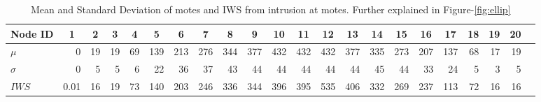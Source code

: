 \documentclass[conference,final]{IEEEtran}
\newcommand{\red}[1]{\pdfmarkupcomment[markup=Highlight,color=red]{#1}}
\newcommand{\green}[1]{\pdfmarkupcomment[markup=Highlight,color=green]{#1}}
\newcommand{\grey}[1]{\pdfmarkupcomment[markup=Highlight,color=gray]{#1}}
\newcommand*{\bd}[1]{\multicolumn{1}{|c}{\bfseries #1}}
\begin{document}

\begin{table}[t!]
\centering
\begin{tabular}{|l|*{20}{r|}r}
\hline
\bd{Node ID}           & \bd{1} & \bd{2} & \bd{3} & \bd{4} & \bd{5} & \bd{6} & \bd{7} & \bd{8} & \bd{9} & \bd{10} & \bd{11} & \bd{12} & \bd{13} & \bd{14} & \bd{15} & \bd{16} & \bd{17} & \bd{18} & \bd{19} & \bd{20} \\
\hline

$\mu$            & 0 &19 & 19& 69&139 &213&276&344&377&432 &432 &432 &377 &335 &273 & 207&137 & 68 & 17 & 19 \\
$\sigma$		 & 0 & 5 & 5 & 6 & 22 & 36& 37&43 &44 & 44 & 44 & 44 & 44 & 45 & 44  & 33 & 24 & 5 & 3 & 5 \\
$\mathit{IWS}$
                 &0.01&16 &19 &73 & 140 &203 &246 &336 &344 &396 &395 &535 &406 &332 &269 &237 &113 & 72& 16 & 16 \\

\hline
\end{tabular}
\caption{Mean and Standard Deviation of motes and IWS from intrusion at motes. Further explained in Figure-\ref{fig:ellip}}
\label{tab:ellip}
\end{table}
\end{document}
